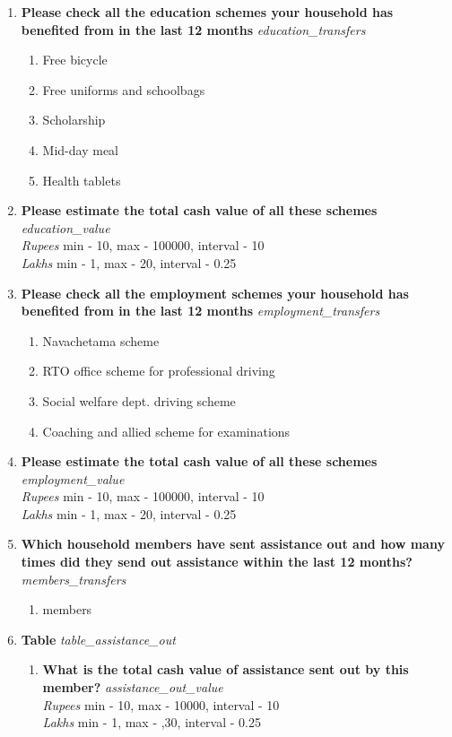 \documentclass{article}
\begin{document}
\begin{enumerate}
\begin{enumerate}[label*=\arabic*.]
\end{enumerate}
\item {\bfseries Please check all the education schemes your household has benefited from in the last 12 months}\emph{ education\_transfers }
\begin{enumerate}
\item Free bicycle
\item Free uniforms and schoolbags
\item Scholarship
\item Mid-day meal
\item Health tablets
\end{enumerate}
\item {\bfseries Please estimate the total cash value of all these schemes}\emph{ education\_value }
\\ \emph{ Rupees }min - 10, max - 100000, interval - 10
\\ \emph{ Lakhs }min - 1, max - 20, interval - 0.25

\item {\bfseries Please check all the employment schemes your household has benefited from in the last 12 months}\emph{ employment\_transfers }
\begin{enumerate}
\item Navachetama scheme
\item RTO office scheme for professional driving
\item Social welfare dept. driving scheme
\item Coaching and allied scheme for examinations
\end{enumerate}
\item {\bfseries Please estimate the total cash value of all these schemes}\emph{ employment\_value }
\\ \emph{ Rupees }min - 10, max - 100000, interval - 10
\\ \emph{ Lakhs }min - 1, max - 20, interval - 0.25

\item {\bfseries Which household members have sent assistance out and how many times did they send out assistance within the last 12 months?}\emph{ members\_transfers }
\begin{enumerate}
\item members
\end{enumerate}
\item {\bfseries Table}\emph{ table\_assistance\_out }
\begin{enumerate}[label*=\arabic*.]
\item {\bfseries What is the total cash value of assistance sent out by this member?}\emph{ assistance\_out\_value }
\\ \emph{ Rupees }min - 10, max - 10000, interval - 10
\\ \emph{ Lakhs }min - 1, max - ,30, interval - 0.25


\end{enumerate}
\end{enumerate}
\end{document}
